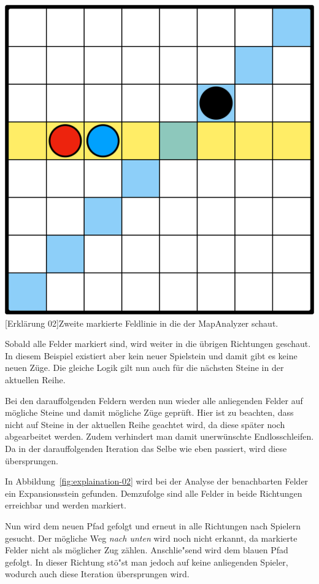 \vspace{1em}
\begin{minipage}{\linewidth}
    \centering
    \includegraphics[width=0.45\linewidth]{pics/explaination/explaination-02}
    [Erkl\"arung 02]{Zweite markierte Feldlinie in die der MapAnalyzer schaut.}
    \label{fig:explaination-02}
\end{minipage}
\vspace{0.5em}

Sobald alle Felder markiert sind, wird weiter in die \"ubrigen Richtungen geschaut.
In diesem Beispiel existiert aber kein neuer Spielstein und damit gibt es keine neuen Z\"uge.
Die gleiche Logik gilt nun auch f\"ur die n\"achsten Steine in der aktuellen Reihe.

Bei den darauffolgenden Feldern werden nun wieder alle anliegenden Felder auf m\"ogliche Steine und damit m\"ogliche Z\"uge gepr\"uft.
Hier ist zu beachten, dass nicht auf Steine in der aktuellen Reihe geachtet wird, da diese sp\"ater noch abgearbeitet werden.
Zudem verhindert man damit unerw\"unschte Endlosschleifen.
Da in der darauffolgenden Iteration das Selbe wie eben passiert, wird diese \"ubersprungen.

In Abbildung~\ref{fig:explaination-02} wird bei der Analyse der benachbarten Felder ein Expansionsstein gefunden.
Demzufolge sind alle Felder in beide Richtungen erreichbar und werden markiert.

Nun wird dem neuen Pfad gefolgt und erneut in alle Richtungen nach Spielern gesucht.
Der m\"ogliche Weg \textit{nach unten} wird noch nicht erkannt, da markierte Felder nicht als m\"oglicher Zug z\"ahlen.
Anschlie"send wird dem blauen Pfad gefolgt.
In dieser Richtung st\"o"st man jedoch auf keine anliegenden Spieler, wodurch auch diese Iteration \"ubersprungen wird.

